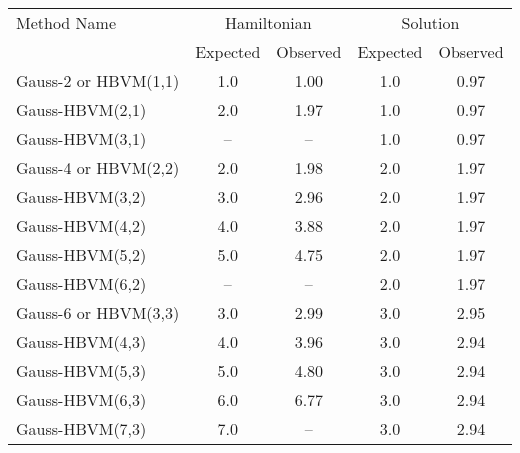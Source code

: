 \begin{tabular}{l|cccc}
\toprule
         Method Name & \multicolumn{2}{c}{Hamiltonian} & \multicolumn{2}{c}{Solution} \\
                     &    Expected & Observed & Expected & Observed \\
\midrule
Gauss-2 or HBVM(1,1) &         1.0 &     1.00 &      1.0 &     0.97 \\
     Gauss-HBVM(2,1) &         2.0 &     1.97 &      1.0 &     0.97 \\
     Gauss-HBVM(3,1) &          -- &       -- &      1.0 &     0.97 \\
Gauss-4 or HBVM(2,2) &         2.0 &     1.98 &      2.0 &     1.97 \\
     Gauss-HBVM(3,2) &         3.0 &     2.96 &      2.0 &     1.97 \\
     Gauss-HBVM(4,2) &         4.0 &     3.88 &      2.0 &     1.97 \\
     Gauss-HBVM(5,2) &         5.0 &     4.75 &      2.0 &     1.97 \\
     Gauss-HBVM(6,2) &          -- &       -- &      2.0 &     1.97 \\
Gauss-6 or HBVM(3,3) &         3.0 &     2.99 &      3.0 &     2.95 \\
     Gauss-HBVM(4,3) &         4.0 &     3.96 &      3.0 &     2.94 \\
     Gauss-HBVM(5,3) &         5.0 &     4.80 &      3.0 &     2.94 \\
     Gauss-HBVM(6,3) &         6.0 &     6.77 &      3.0 &     2.94 \\
     Gauss-HBVM(7,3) &         7.0 &       -- &      3.0 &     2.94 \\
\bottomrule
\end{tabular}
